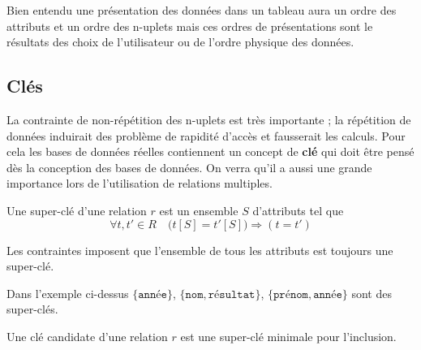 \medskip


Bien entendu une présentation des données dans un tableau aura un ordre des attributs et un ordre des n-uplets mais ces ordres de présentations sont le résultats des choix de l'utilisateur ou de l'ordre physique des données.

\newpage
\subsection{Clés}
La contrainte de non-répétition des n-uplets est très importante ; la répétition de données induirait des problème de rapidité d'accès et fausserait les calculs. Pour cela les bases de données réelles contiennent un concept de {\bf clé} qui doit être pensé dès la conception des bases de données. On verra qu'il a aussi une grande importance lors de l'utilisation de relations multiples.
\begin{defin}

Une super-clé d'une relation $r$ est un ensemble $S$ d'attributs tel que
\[\forall t,t' \in R\quad \bigl(t[S]=t'[S]\bigr) \Rightarrow (t=t')\]
\end{defin}
Les contraintes imposent que l'ensemble de tous les attributs est toujours une super-clé.

\medskip

Dans l'exemple ci-dessus $\{\texttt{année}\}$, 
$\{\texttt{nom},\texttt{résultat}\}$, 
$\{\texttt{prénom},\texttt{année}\}$ sont des super-clés.

\begin{defin}

Une clé candidate d'une relation $r$ est une super-clé minimale pour l'inclusion.
\end{defin}

